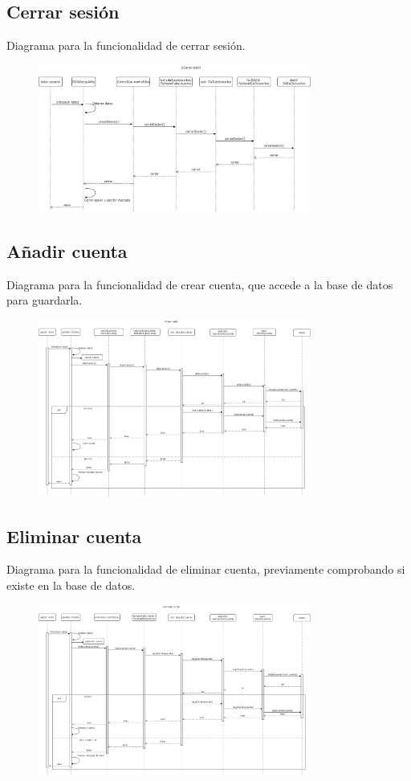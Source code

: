 \documentclass[12pt]{article}
\begin{document}
\subsection{Cerrar sesión}
Diagrama para la funcionalidad de cerrar sesión.
\begin{figure}[H]
    \centering
    \includegraphics[width=0.8\textwidth]{images/2-CerrarSesionFinal.png}
\end{figure}
\subsection{Añadir cuenta}
Diagrama para la funcionalidad de crear cuenta, que accede a la base de datos para guardarla.
\begin{figure}[H]
    \centering
    \includegraphics[width=0.8\textwidth]{images/3-crear_cuenta.png}
\end{figure}
\subsection{Eliminar cuenta}
Diagrama para la funcionalidad de eliminar cuenta, previamente comprobando si existe en la base de datos.
\begin{figure}[H]
    \centering
    \includegraphics[width=0.8\textwidth]{images/eliminar_cuenta.png}
\end{figure}
\end{document}
